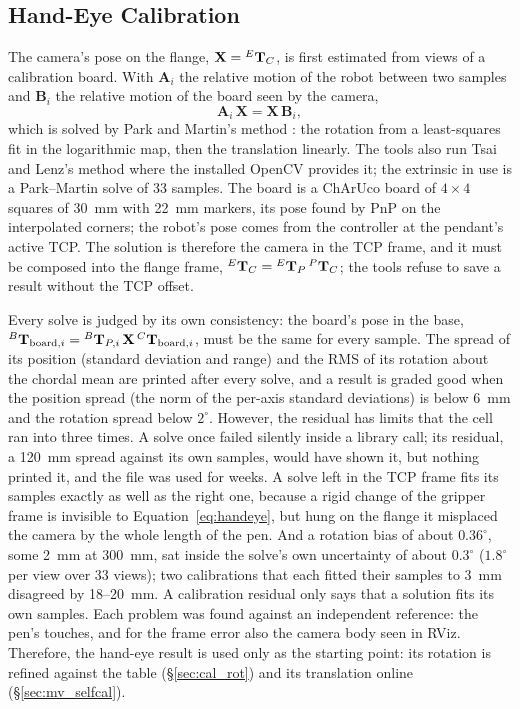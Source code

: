 \subsection{Hand-Eye Calibration}
\label{sec:mc_handeye}
The camera's pose on the flange, $\mathbf{X}={}^{E}\mathbf{T}_{C}$, is first estimated from views of a
calibration board. With $\mathbf{A}_i$ the relative motion of the robot between two samples and
$\mathbf{B}_i$ the relative motion of the board seen by the camera,
\begin{equation}
\mathbf{A}_i\,\mathbf{X} = \mathbf{X}\,\mathbf{B}_i,
\label{eq:handeye}
\end{equation}
which is solved by Park and Martin's method \cite{park1994handeye}: the rotation from a
least-squares fit in the logarithmic map, then the translation linearly. The tools also run Tsai
and Lenz's method \cite{tsai1989handeye} where the installed OpenCV provides it; the extrinsic in
use is a Park--Martin solve of 33 samples. The board is a ChArUco board of
$4\times4$ squares of 30~mm with 22~mm markers, its pose found by PnP on the interpolated
corners; the robot's pose comes from the controller at the pendant's active TCP. The solution is
therefore the camera in the TCP frame, and it must be composed into the flange frame,
${}^{E}\mathbf{T}_{C}={}^{E}\mathbf{T}_{P}\,{}^{P}\mathbf{T}_{C}$; the tools refuse to save a result without the TCP offset.

Every solve is judged by its own consistency: the board's pose in the base,
${}^{B}\mathbf{T}_{\mathrm{board},i}={}^{B}\mathbf{T}_{P,i}\,\mathbf{X}\,{}^{C}\mathbf{T}_{\mathrm{board},i}$, must be the same for
every sample. The spread of its position (standard deviation and range) and the RMS of its
rotation about the chordal mean are printed after every solve, and a result is graded good when
the position spread (the norm of the per-axis standard deviations) is below 6~mm and the rotation
spread below $2^\circ$. However, the residual has limits that the cell ran into three times. A
solve once failed silently inside a library call; its residual, a 120~mm spread against its own
samples, would have shown it, but nothing printed it, and the file was used for weeks. A solve left
in the TCP frame fits its samples exactly as well as the right one, because a rigid change of the
gripper frame is invisible to Equation~\ref{eq:handeye}, but hung on the flange it misplaced the
camera by the whole length of the pen. And a rotation bias of about $0.36^\circ$, some 2~mm at
300~mm, sat inside the solve's own uncertainty of about $0.3^\circ$ ($1.8^\circ$ per view over 33
views); two calibrations that each fitted their samples to 3~mm disagreed by 18--20~mm. A
calibration residual only says that a solution fits its own samples. Each problem was found against
an independent reference: the pen's touches, and for the frame error also the camera body seen in
RViz. Therefore, the hand-eye
result is used only as the starting point: its rotation is refined against the table
(\S\ref{sec:cal_rot}) and its translation online (\S\ref{sec:mv_selfcal}).

